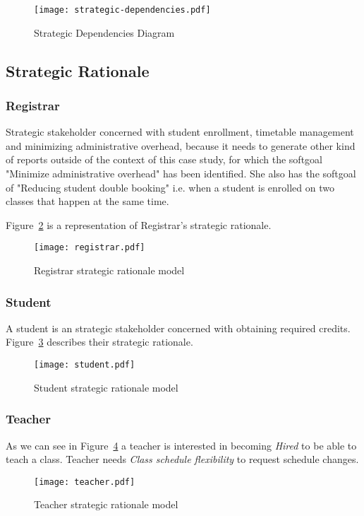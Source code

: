 \begin{figure}
	\caption{Strategic Dependencies Diagram}\label{fig:strategicDependenciesDiagram}
	\centering
	\texttt{[image: strategic-dependencies.pdf]}
\end{figure}

\subsection*{Strategic Rationale}
\subsubsection*{Registrar}
Strategic stakeholder concerned with student enrollment, timetable management and minimizing administrative overhead, because it needs to generate other kind of reports outside of the context of this case study, for which the softgoal "Minimize administrative overhead" has been identified.
She also has the softgoal of "Reducing student double booking" i.e. when a student is enrolled on two classes that happen at the same time.

Figure~\ref{fig:actorBoundaryRegistrar} is a representation of Registrar's strategic rationale.

\begin{landscape}
	\begin{figure}
		\centering
		\caption{Registrar strategic rationale model}
		\texttt{[image: registrar.pdf]}
		\label{fig:actorBoundaryRegistrar}
	\end{figure}
\end{landscape}

\subsubsection*{Student}
A student is an strategic stakeholder concerned with obtaining required credits.
Figure~\ref{fig:actorBoundaryStudent} describes their strategic rationale.
\begin{figure}
	\centering
	\caption{Student strategic rationale model}
	\texttt{[image: student.pdf]}
	\label{fig:actorBoundaryStudent}
\end{figure}

\subsubsection*{Teacher}
As we can see in Figure~\ref{fig:actorBoundaryTeacher} a teacher is interested in becoming \textit{Hired} to be able to teach a class.
Teacher needs \textit{Class schedule flexibility} to request schedule changes.

\begin{figure}
	\centering
	\caption{Teacher strategic rationale model}
	\label{fig:actorBoundaryTeacher}
	\texttt{[image: teacher.pdf]}
\end{figure}

